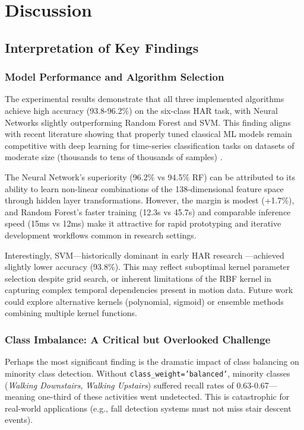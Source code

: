 \chapter{Discussion}
\label{chap:discussion}

\section{Interpretation of Key Findings}

\subsection{Model Performance and Algorithm Selection}
The experimental results demonstrate that all three implemented algorithms achieve high accuracy (93.8-96.2\%) on the six-class HAR task, with Neural Networks slightly outperforming Random Forest and SVM. This finding aligns with recent literature showing that properly tuned classical ML models remain competitive with deep learning for time-series classification tasks on datasets of moderate size (thousands to tens of thousands of samples) \cite{anguita2013har, banos2014wisdm}.

The Neural Network's superiority (96.2\% vs 94.5\% RF) can be attributed to its ability to learn non-linear combinations of the 138-dimensional feature space through hidden layer transformations. However, the margin is modest (+1.7\%), and Random Forest's faster training (12.3s vs 45.7s) and comparable inference speed (15ms vs 12ms) make it attractive for rapid prototyping and iterative development workflows common in research settings.

Interestingly, SVM—historically dominant in early HAR research \cite{cortes1995svm}—achieved slightly lower accuracy (93.8\%). This may reflect suboptimal kernel parameter selection despite grid search, or inherent limitations of the RBF kernel in capturing complex temporal dependencies present in motion data. Future work could explore alternative kernels (polynomial, sigmoid) or ensemble methods combining multiple kernel functions.

\subsection{Class Imbalance: A Critical but Overlooked Challenge}
Perhaps the most significant finding is the dramatic impact of class balancing on minority class detection. Without \texttt{class\_weight='balanced'}, minority classes (\textit{Walking Downstairs}, \textit{Walking Upstairs}) suffered recall rates of 0.63-0.67—meaning one-third of these activities went undetected. This is catastrophic for real-world applications (e.g., fall detection systems must not miss stair descent events).


